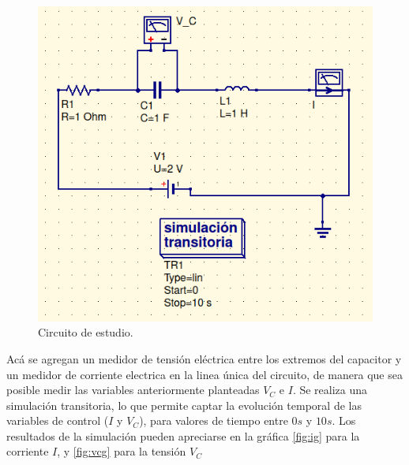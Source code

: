 \documentclass[letterpaper,12pt]{article} %
\begin{document}
\begin{figure}[h]
\includegraphics[scale=0.5]{circ.png}
\centering
\caption{Circuito de estudio.}
\label{fig:circ}
\end{figure}
Acá se agregan un medidor de tensión eléctrica entre los extremos del capacitor y un medidor de corriente electrica en la linea única del circuito, de manera que sea posible medir las variables anteriormente planteadas $V_C$ e $I$. Se realiza una simulación transitoria, lo que permite captar la evolución temporal de las variables de control ($I$ y $V_C$), para valores de tiempo entre $0 s$ y $10 s$. Los resultados de la simulación pueden apreciarse en la gráfica \ref{fig:ig} para la corriente $I$, y \ref{fig:vcg} para la tensión $V_C$
\end{document}
